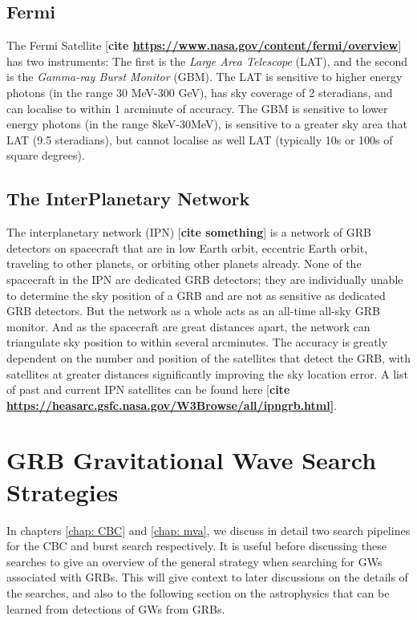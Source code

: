 \documentclass[11pt]{cuthesis}
\begin{document}
\subsection{Fermi}
The Fermi Satellite [\textbf{cite \url{https://www.nasa.gov/content/fermi/overview}}] has two instruments: The first is the \textit{Large Area Telescope} (LAT), and the second is the \textit{Gamma-ray Burst Monitor} (GBM). The LAT is sensitive to higher energy photons (in the range 30 MeV-300 GeV), has sky coverage of  2 steradians, and can localise to within 1 arcminute of accuracy. The GBM is sensitive to lower energy photons (in the range 8keV-30MeV), is sensitive to a greater sky area that LAT (9.5 steradians), but cannot localise as well LAT (typically 10s or 100s of square degrees). 

\subsection{The InterPlanetary Network}
The interplanetary network (IPN) [\textbf{cite something}] is a network of GRB detectors on spacecraft that are in low Earth orbit, eccentric Earth orbit, traveling to other planets, or orbiting other planets already. None of the spacecraft in the IPN are dedicated GRB detectors; they are individually unable to determine the sky position of a GRB and are not as sensitive as dedicated GRB detectors. But the network as a whole acts as an all-time all-sky GRB monitor. And as the spacecraft are great distances apart, the network can triangulate sky position to within several arcminutes. The accuracy is greatly dependent on the number and position of the satellites that detect the GRB, with satellites at greater distances significantly improving the sky location error. A list of past and current IPN satellites can be found here [\textbf{cite \url{https://heasarc.gsfc.nasa.gov/W3Browse/all/ipngrb.html}]}.

\section{GRB Gravitational Wave Search Strategies}
In chapters \ref{chap: CBC} and \ref{chap: mva}, we discuss in detail two search pipelines for the CBC and burst search respectively. It is useful before discussing these searches to give an overview of the general strategy when searching for GWs associated with GRBs. This will give context to later discussions on the details of the searches, and also to the following section on the astrophysics that can be learned from detections of GWs from GRBs. 
\end{document}
